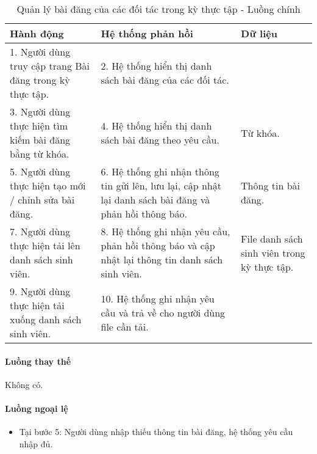 \documentclass[./../main.tex]{subfiles}
\begin{document}
\begin{table}[H]
	\caption{Quản lý bài đăng của các đối tác trong kỳ thực tập - Luồng chính}
	\label{tab:orgAdmin_manage_internship_posts}
	\begin{tabularx}{\textwidth}{|X|X|X|}
		\hline
		\textbf{Hành động}                                       & \textbf{Hệ thống phản hồi}                                                                              & \textbf{Dữ liệu}                            \\ \hline
		1. Người dùng truy cập trang Bài đăng trong kỳ thực tập. & 2. Hệ thống hiển thị danh sách bài đăng của các đối tác.                                                &                                             \\ \hline
		3. Người dùng thực hiện tìm kiếm bài đăng bằng từ khóa.  & 4. Hệ thống hiển thị danh sách bài đăng theo yêu cầu.                                                   & Từ khóa.                                    \\ \hline
		5. Người dùng thực hiện tạo mới / chỉnh sửa bài đăng.    & 6. Hệ thống ghi nhận thông tin gửi lên, lưu lại, cập nhật lại danh sách bài đăng và phản hồi thông báo. & Thông tin bài đăng.                         \\ \hline
		7. Người dùng thực hiện tải lên danh sách sinh viên.     & 8. Hệ thống ghi nhận yêu cầu, phản hồi thông báo và cập nhật lại thông tin danh sách sinh viên.         & File danh sách sinh viên trong kỳ thực tập. \\ \hline
		9. Người dùng thực hiện tải xuống danh sách sinh viên.   & 10. Hệ thống ghi nhận yêu cầu và trả về cho người dùng file cần tải.                                    &                                             \\ \hline
	\end{tabularx}
\end{table}

\paragraph*{Luồng thay thế} Không có.

\paragraph*{Luồng ngoại lệ}

\begin{itemize}
	\item

	      Tại bước 5: Người dùng nhập thiếu thông tin bài đăng, hệ thống yêu cầu nhập đủ.

\end{itemize}
\end{document}
